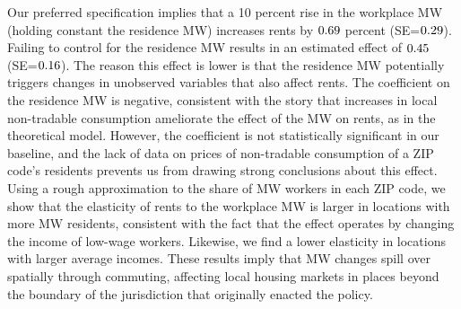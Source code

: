 
Our preferred specification implies that 
a 10 percent rise in the workplace MW (holding constant the residence MW) 
increases rents by $0.69$ percent (SE=$0.29$).
Failing to control for the residence MW results in an estimated effect of 
$0.45$ (SE=$0.16$).
The reason this effect is lower is that the residence MW potentially triggers 
changes in unobserved variables that also affect rents.
The coefficient on the residence MW is negative, consistent with the story 
that increases in local non-tradable consumption ameliorate the effect of the
MW on rents, as in the theoretical model.
However, the coefficient is not statistically significant in our baseline,
and the lack of data on prices of non-tradable consumption of a ZIP code's 
residents prevents us from drawing strong conclusions about this effect.
Using a rough approximation to the share of MW workers in each ZIP code, we show 
that the elasticity of rents to the workplace MW is larger in locations 
with more MW residents, consistent with the fact that the effect operates by
changing the income of low-wage workers.
Likewise, we find a lower elasticity in locations with larger average incomes.
These results imply that MW changes spill over spatially through commuting, 
affecting local housing markets in places beyond the boundary of the 
jurisdiction that originally enacted the policy.


